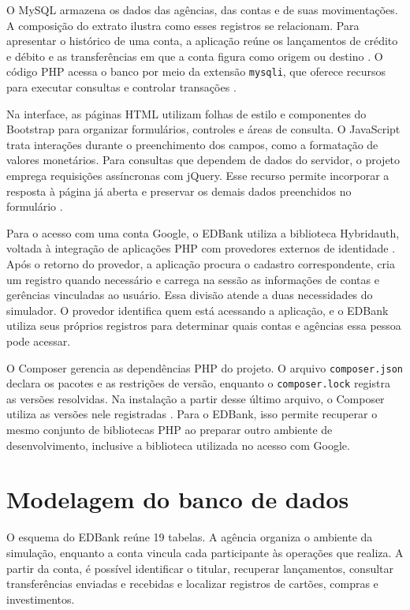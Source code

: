 O MySQL armazena os dados das agências, das contas e de suas
movimentações. A composição do extrato ilustra como esses registros
se relacionam. Para apresentar o histórico de uma conta, a aplicação
reúne os lançamentos de crédito e débito e as transferências em que
a conta figura como origem ou destino \cite{bravin2026edbank}.
O código PHP acessa o banco por meio da extensão \texttt{mysqli},
que oferece recursos para executar consultas e controlar transações
\cite{phpMysqli}.

Na interface, as páginas HTML utilizam folhas de estilo e
componentes do Bootstrap para organizar formulários, controles e
áreas de consulta. O JavaScript trata interações durante o
preenchimento dos campos, como a formatação de valores monetários.
Para consultas que dependem de dados do servidor, o projeto emprega
requisições assíncronas com jQuery. Esse recurso permite incorporar
a resposta à página já aberta e preservar os demais dados
preenchidos no formulário \cite{jqueryAjax}.

Para o acesso com uma conta Google, o EDBank utiliza a biblioteca
Hybridauth, voltada à integração de aplicações PHP com provedores
externos de identidade \cite{hybridauth}. Após o retorno do provedor,
a aplicação procura o cadastro correspondente, cria um registro
quando necessário e carrega na sessão as informações de contas e
gerências vinculadas ao usuário. Essa divisão atende a duas
necessidades do simulador. O provedor identifica quem está
acessando a aplicação, e o EDBank utiliza seus próprios registros
para determinar quais contas e agências essa pessoa pode acessar.

O Composer gerencia as dependências PHP do projeto. O arquivo
\texttt{composer.json} declara os pacotes e as restrições de versão,
enquanto o \texttt{composer.lock} registra as versões resolvidas.
Na instalação a partir desse último arquivo, o Composer utiliza
as versões nele registradas \cite{composerUso}. Para o EDBank,
isso permite recuperar o mesmo conjunto de bibliotecas PHP ao
preparar outro ambiente de desenvolvimento, inclusive a biblioteca
utilizada no acesso com Google.

\section{Modelagem do banco de dados} %
\label{cap-desenvolvimento-banco-dados}

O esquema do EDBank reúne 19 tabelas. A agência organiza o ambiente
da simulação, enquanto a conta vincula cada participante às operações
que realiza. A partir da conta, é possível identificar o titular,
recuperar lançamentos, consultar transferências enviadas e recebidas
e localizar registros de cartões, compras e investimentos.

